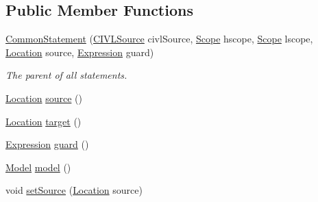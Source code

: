 \subsection*{Public Member Functions}
\begin{DoxyCompactItemize}
\item 
\hyperlink{classedu_1_1udel_1_1cis_1_1vsl_1_1civl_1_1model_1_1common_1_1statement_1_1CommonStatement_a085eda88f8a7e5b8002f9a88fa95d9d0}{Common\+Statement} (\hyperlink{interfaceedu_1_1udel_1_1cis_1_1vsl_1_1civl_1_1model_1_1IF_1_1CIVLSource}{C\+I\+V\+L\+Source} civl\+Source, \hyperlink{interfaceedu_1_1udel_1_1cis_1_1vsl_1_1civl_1_1model_1_1IF_1_1Scope}{Scope} hscope, \hyperlink{interfaceedu_1_1udel_1_1cis_1_1vsl_1_1civl_1_1model_1_1IF_1_1Scope}{Scope} lscope, \hyperlink{interfaceedu_1_1udel_1_1cis_1_1vsl_1_1civl_1_1model_1_1IF_1_1location_1_1Location}{Location} source, \hyperlink{interfaceedu_1_1udel_1_1cis_1_1vsl_1_1civl_1_1model_1_1IF_1_1expression_1_1Expression}{Expression} guard)
\begin{DoxyCompactList}\small\item\em The parent of all statements. \end{DoxyCompactList}\item 
\hyperlink{interfaceedu_1_1udel_1_1cis_1_1vsl_1_1civl_1_1model_1_1IF_1_1location_1_1Location}{Location} \hyperlink{classedu_1_1udel_1_1cis_1_1vsl_1_1civl_1_1model_1_1common_1_1statement_1_1CommonStatement_a73170ca0abd0f7c6353e659113296fb8}{source} ()
\item 
\hyperlink{interfaceedu_1_1udel_1_1cis_1_1vsl_1_1civl_1_1model_1_1IF_1_1location_1_1Location}{Location} \hyperlink{classedu_1_1udel_1_1cis_1_1vsl_1_1civl_1_1model_1_1common_1_1statement_1_1CommonStatement_a604aaca80985803d793cf1b2f5c8e202}{target} ()
\item 
\hyperlink{interfaceedu_1_1udel_1_1cis_1_1vsl_1_1civl_1_1model_1_1IF_1_1expression_1_1Expression}{Expression} \hyperlink{classedu_1_1udel_1_1cis_1_1vsl_1_1civl_1_1model_1_1common_1_1statement_1_1CommonStatement_afd799466de9aca0c89dbbd5f43d3d251}{guard} ()
\item 
\hyperlink{interfaceedu_1_1udel_1_1cis_1_1vsl_1_1civl_1_1model_1_1IF_1_1Model}{Model} \hyperlink{classedu_1_1udel_1_1cis_1_1vsl_1_1civl_1_1model_1_1common_1_1statement_1_1CommonStatement_a0afeefdbd8fa08ab87a0cef2f52ad5b7}{model} ()
\item 
void \hyperlink{classedu_1_1udel_1_1cis_1_1vsl_1_1civl_1_1model_1_1common_1_1statement_1_1CommonStatement_a2c015c168e9a0e1abffa81ca26c15792}{set\+Source} (\hyperlink{interfaceedu_1_1udel_1_1cis_1_1vsl_1_1civl_1_1model_1_1IF_1_1location_1_1Location}{Location} source)

\end{DoxyCompactItemize}
